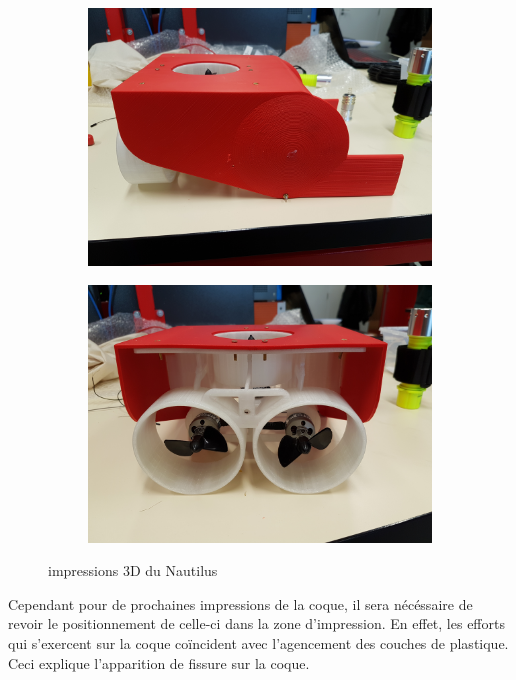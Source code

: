 \documentclass[a4paper,11pt]{report}
\begin{document}
				\begin{figure}[!h]
						\centering
							\begin{subfigure}[b]{0.3\textwidth}
								\includegraphics[width=\textwidth]{Photos/Capture15.jpg}
							\end{subfigure}
							\begin{subfigure}[b]{0.3\textwidth}
								\includegraphics[width=\textwidth]{Photos/Capture16.jpg}
							\end{subfigure}
							\caption{impressions 3D du Nautilus}
					\end{figure}\newline
					
					Cependant pour de prochaines impressions de la coque, il sera nécéssaire de revoir le positionnement de celle-ci dans la zone d'impression. En effet, les efforts qui s'exercent sur la coque coïncident avec l'agencement des couches de plastique. Ceci explique l'apparition de fissure sur la coque.
					
\end{document}
